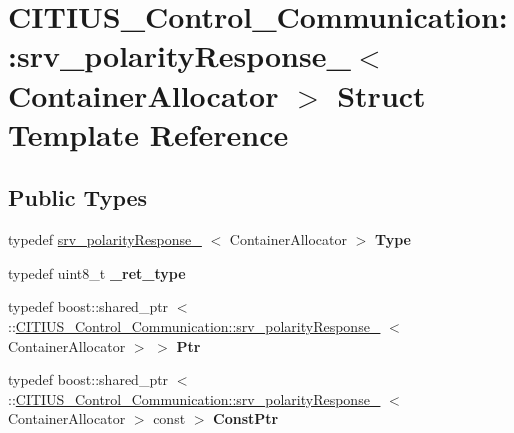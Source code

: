 \hypertarget{struct_c_i_t_i_u_s___control___communication_1_1srv__polarity_response__}{\section{\-C\-I\-T\-I\-U\-S\-\_\-\-Control\-\_\-\-Communication\-:\-:srv\-\_\-polarity\-Response\-\_\-$<$ \-Container\-Allocator $>$ \-Struct \-Template \-Reference}
\label{struct_c_i_t_i_u_s___control___communication_1_1srv__polarity_response__}
}
\subsection*{\-Public \-Types}
\begin{DoxyCompactItemize}
\item 
\hypertarget{struct_c_i_t_i_u_s___control___communication_1_1srv__polarity_response___a7395a8d2bfffa668631a9800c3f59a13}{typedef \hyperlink{struct_c_i_t_i_u_s___control___communication_1_1srv__polarity_response__}{srv\-\_\-polarity\-Response\-\_\-}\*
$<$ \-Container\-Allocator $>$ {\bfseries \-Type}}\label{struct_c_i_t_i_u_s___control___communication_1_1srv__polarity_response___a7395a8d2bfffa668631a9800c3f59a13}

\item 
\hypertarget{struct_c_i_t_i_u_s___control___communication_1_1srv__polarity_response___ab35c088ea954dbed47df04e21bbe6ef2}{typedef uint8\-\_\-t {\bfseries \-\_\-ret\-\_\-type}}\label{struct_c_i_t_i_u_s___control___communication_1_1srv__polarity_response___ab35c088ea954dbed47df04e21bbe6ef2}

\item 
\hypertarget{struct_c_i_t_i_u_s___control___communication_1_1srv__polarity_response___ab93deebc4ba0503bb1abdb4e0380a958}{typedef boost\-::shared\-\_\-ptr\*
$<$ \-::\hyperlink{struct_c_i_t_i_u_s___control___communication_1_1srv__polarity_response__}{\-C\-I\-T\-I\-U\-S\-\_\-\-Control\-\_\-\-Communication\-::srv\-\_\-polarity\-Response\-\_\-}\*
$<$ \-Container\-Allocator $>$ $>$ {\bfseries \-Ptr}}\label{struct_c_i_t_i_u_s___control___communication_1_1srv__polarity_response___ab93deebc4ba0503bb1abdb4e0380a958}

\item 
\hypertarget{struct_c_i_t_i_u_s___control___communication_1_1srv__polarity_response___a5b1e6bcbed710b1dfcba345d32c0c025}{typedef boost\-::shared\-\_\-ptr\*
$<$ \-::\hyperlink{struct_c_i_t_i_u_s___control___communication_1_1srv__polarity_response__}{\-C\-I\-T\-I\-U\-S\-\_\-\-Control\-\_\-\-Communication\-::srv\-\_\-polarity\-Response\-\_\-}\*
$<$ \-Container\-Allocator $>$ const  $>$ {\bfseries \-Const\-Ptr}}\label{struct_c_i_t_i_u_s___control___communication_1_1srv__polarity_response___a5b1e6bcbed710b1dfcba345d32c0c025}

\end{DoxyCompactItemize}
